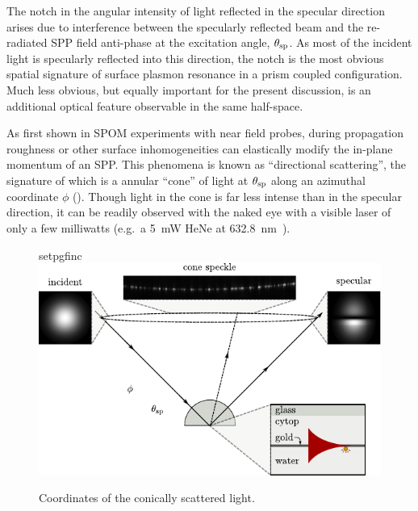 The notch in the angular intensity of light reflected in the specular
direction arises due to interference between the specularly reflected beam
and the re-radiated SPP field anti-phase at the excitation angle,
$\theta_\mathrm{sp}$.  As most of the incident light is specularly reflected into
this direction, the notch is the most obvious spatial signature of surface
plasmon resonance in a prism coupled configuration.  Much less obvious, but
equally important for the present discussion, is an additional optical
feature observable in the same half-space.

As first shown in SPOM experiments with near field probes, during propagation
roughness or other surface inhomogeneities can elastically modify the
in-plane momentum of an SPP\@.  This phenomena is known as ``directional
scattering'', the signature of which is a annular ``cone'' of light at
$\theta_\mathrm{sp}$ along an azimuthal coordinate $\phi$ ().
Though light in the cone is far less intense than in the specular
direction, it can be readily observed with the naked eye with a visible
laser of only a few milliwatts (e.g.\ a \SI{5}{\milli\watt} HeNe at
\SI{632.8}{\nano\meter}~\cite{schumann2009surface}).
\begin{figure}[ht]
 \centering
 {setpgfinc}
 \includegraphics{existence/figures/conefig}
 \caption{Coordinates of the conically scattered light.}
\label{fig:conefig}
\end{figure}

